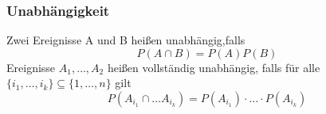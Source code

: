 \documentclass[
	ngerman,
	accentcolor=9c,%
	type=intern,
	marginpar=false
	]{tudapub}
\begin{document}
            \subsubsection{Unabhängigkeit}
                \setcounter{satz}{2}
                \begin{definition}
                    Zwei Ereignisse A und B heißen unabhängig,falls
                    \begin{equation*}
                        P(A\cap B) = P(A)P(B)
                    \end{equation*}
                    Ereignisse $A_1, \dots, A_2$ heißen vollständig unabhängig, falls für alle $\{i_1, \dots, i_k\} \subseteq \{1, \dots, n\}$ gilt
                    \begin{equation*}
                        P(A_{i_1} \cap \dots A_{i_k}) = P(A_{i_1}) \cdot \dots \cdot P(A_{i_k})
                    \end{equation*}
                \end{definition}
\end{document}
